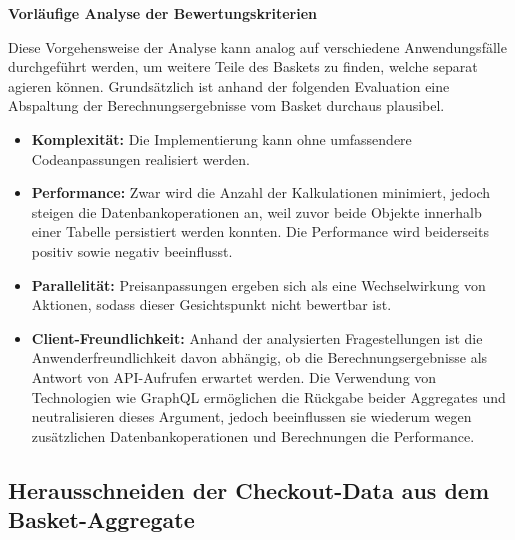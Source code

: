 \textbf{Vorläufige Analyse der Bewertungskriterien}

Diese Vorgehensweise der Analyse kann analog auf verschiedene Anwendungsfälle durchgeführt werden, um weitere Teile des Baskets zu finden, welche separat agieren können. Grundsätzlich ist anhand der folgenden Evaluation eine Abspaltung der Berechnungsergebnisse vom Basket durchaus plausibel.

\begin{itemize}[topsep=-2pt]
	\item \textbf{Komplexität: } { Die Implementierung kann ohne umfassendere Codeanpassungen realisiert werden. }
	\item \textbf{Performance: } { Zwar wird die Anzahl der Kalkulationen minimiert, jedoch steigen die Datenbankoperationen an, weil zuvor beide Objekte innerhalb einer Tabelle persistiert werden konnten. Die Performance wird beiderseits positiv sowie negativ beeinflusst. }
	\item \textbf{Parallelität: } { Preisanpassungen ergeben sich als eine Wechselwirkung von Aktionen, sodass dieser Gesichtspunkt nicht bewertbar ist. }
	\item \textbf{Client-Freundlichkeit: } { Anhand der analysierten Fragestellungen ist die Anwenderfreundlichkeit davon abhängig, ob die Berechnungsergebnisse als Antwort von API-Aufrufen erwartet werden. Die Verwendung von Technologien wie GraphQL ermöglichen die Rückgabe beider Aggregates und neutralisieren dieses Argument, jedoch beeinflussen sie wiederum wegen zusätzlichen Datenbankoperationen und Berechnungen die Performance. }
\end{itemize}



\subsection{Herausschneiden der Checkout-Data aus dem Basket-Aggregate}

